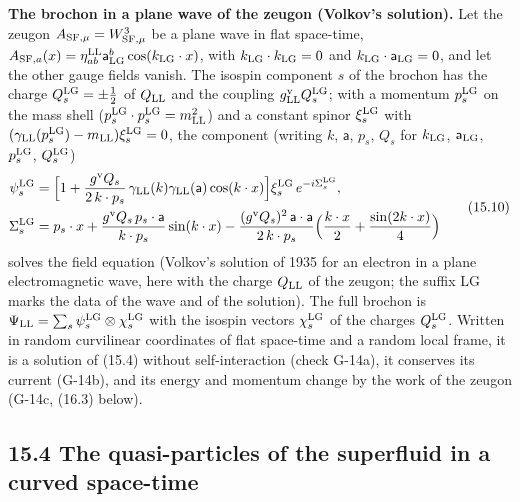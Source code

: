 \documentclass[
  10pt,
]{article}
\begin{document}
\textbf{The brochon in a plane wave of the zeugon (Volkov's solution).}
Let the zeugon \(A_{{\rm SF},\mu}=W^3_{{\rm SF},\mu}\) be a plane wave
in flat space-time,
\(A_{{\rm SF},a}(x)=\eta^{\rm LL}_{ab}\mathsf a^b_{\rm LG}\cos(k_{\rm LG}\cdot x)\),
with \(k_{\rm LG}\cdot k_{\rm LG}=0\) and
\(k_{\rm LG}\cdot\mathsf a_{\rm LG}=0\), and let the other gauge fields
vanish. The isospin component \(s\) of the brochon has the charge
\(Q^{\rm LG}_s=\pm\tfrac12\) of \(Q_{\rm LL}\) and the coupling
\(g^{\rm v}_{\rm LL}Q^{\rm LG}_s\); with a momentum \(p^{\rm LG}_s\) on
the mass shell (\(p^{\rm LG}_s\cdot p^{\rm LG}_s=m_{\rm LL}^2\)) and a
constant spinor \(\xi^{\rm LG}_s\) with
\((\gamma_{\rm LL}(p^{\rm LG}_s)-m_{\rm LL})\xi^{\rm LG}_s=0\), the
component (writing \(k\), \(\mathsf a\), \(p_s\), \(Q_s\) for
\(k_{\rm LG}\), \(\mathsf a_{\rm LG}\), \(p^{\rm LG}_s\),
\(Q^{\rm LG}_s\))
\[\begin{aligned}\psi^{\rm LG}_s&=\Big[1+\frac{g^{\rm v}Q_s}{2\,k\cdot p_s}\,\gamma_{\rm LL}(k)\gamma_{\rm LL}(\mathsf a)\cos(k\cdot x)\Big]\xi^{\rm LG}_s\,e^{-i\Sigma^{\rm LG}_s},\\\Sigma^{\rm LG}_s&=p_s\cdot x+\frac{g^{\rm v}Q_s\,p_s\cdot\mathsf a}{k\cdot p_s}\sin(k\cdot x)-\frac{(g^{\rm v}Q_s)^2\,\mathsf a\cdot\mathsf a}{2\,k\cdot p_s}\Big(\frac{k\cdot x}2+\frac{\sin(2k\cdot x)}4\Big)\end{aligned}\tag{15.10}\]
solves the field equation (Volkov's solution of 1935 for an electron in
a plane electromagnetic wave, here with the charge \(Q_{\rm LL}\) of the
zeugon; the suffix LG marks the data of the wave and of the solution).
The full brochon is
\(\Psi_{\rm LL}=\sum_s\psi^{\rm LG}_s\otimes\chi^{\rm LG}_s\) with the
isospin vectors \(\chi^{\rm LG}_s\) of the charges \(Q^{\rm LG}_s\).
Written in random curvilinear coordinates of flat space-time and a
random local frame, it is a solution of (15.4) without self-interaction
(check G-14a), it conserves its current (G-14b), and its energy and
momentum change by the work of the zeugon (G-14c, (16.3) below).

\hypertarget{the-quasi-particles-of-the-superfluid-in-a-curved-space-time}{%
\subsection{15.4 The quasi-particles of the superfluid in a curved
space-time}\label{the-quasi-particles-of-the-superfluid-in-a-curved-space-time}}
\end{document}
